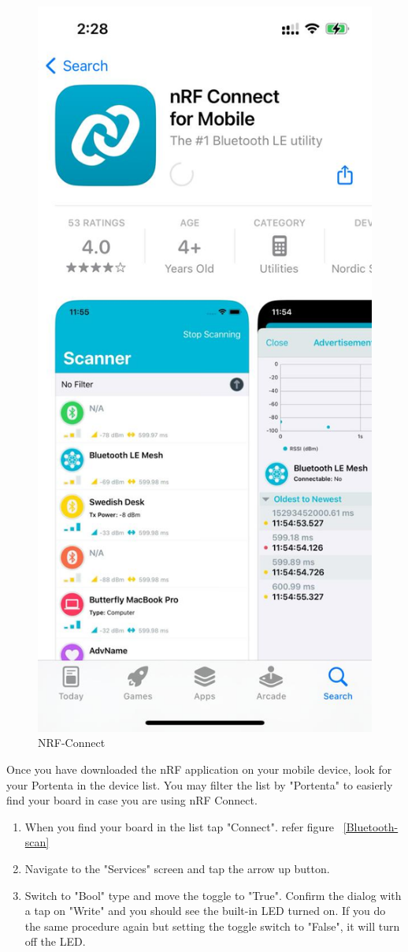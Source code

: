 \begin{itemize}
	\begin{figure}
		\begin{center}
			\includegraphics[width=0.7\linewidth]{Images/PortentaH7/NRF-Connect.jpg}
			\caption{NRF-Connect}
			\label{NRF-Connect}
		\end{center}
	\end{figure}
	
	Once you have downloaded the nRF application on your mobile device, look for your Portenta in the device list. You may filter the list by "Portenta" to easierly find your board in case you are using nRF Connect. \cite{bluetoothPortentaH7:2024}
	
	\begin{enumerate}
		\item When you find your board in the list tap "Connect". refer figure ~\ref{Bluetooth-scan}
		\item Navigate to the "Services" screen and tap the arrow up button.
		\item Switch to "Bool" type and move the toggle to "True". Confirm the dialog with a tap on "Write" and you should see the built-in LED turned on. If you do the same procedure again but setting the toggle switch to "False", it will turn off the LED.  \cite{bluetoothPortentaH7:2024}
	\end{enumerate}
	

\end{itemize}
